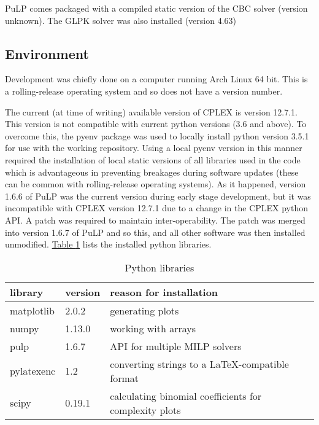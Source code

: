 PuLP comes packaged with a compiled static version of the CBC solver (version
unknown).
The GLPK solver was also installed (version 4.63)

\subsection{Environment}\label{SS.envir}

Development was chiefly done on a computer running Arch Linux 64 bit.
This is a rolling-release operating system and so does not have a version
number.

The current (at time of writing) available version of CPLEX is version 12.7.1.
This version is not compatible with current python versions (3.6 and above).
To overcome this, the pyenv package was used to locally install python version
3.5.1 for use with the working repository.
Using a local pyenv version in this manner required the installation of local
static versions of all libraries used in the code which is advantageous in
preventing breakages during software updates (these can be common with
rolling-release operating systems).
As it happened, version 1.6.6 of PuLP was the current version during early
stage development, but it was incompatible with CPLEX version 12.7.1 due to a
change in the CPLEX python API.  A patch was required to maintain
inter-operability.  The patch was merged into version 1.6.7 of PuLP and so this,
and all other software was then installed unmodified.
\hyperref[tbl.libs]{Table \ref*{tbl.libs}} lists the installed python
libraries.

\begin{table}[h!]
    \centering
    \caption{Python libraries}
    \label{tbl.libs}
    \begin{tabular}{l  l  l }
        library & version & reason for installation\\ \hline
        matplotlib & 2.0.2 & generating plots \\
        numpy & 1.13.0 & working with arrays \\
        pulp & 1.6.7 & API for multiple MILP solvers \\
        pylatexenc & 1.2 & converting strings to a \LaTeX-compatible format \\
        scipy & 0.19.1 & calculating binomial coefficients for complexity
            plots \\
    \end{tabular}
\end{table}

